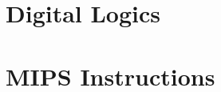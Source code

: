 \documentclass{article}
\begin{document}
\thispagestyle{empty}

\begin{minipage}[t]{0.48\linewidth}
	\section{Digital Logics}
	\begin{multicols}{4}
		
	\end{multicols}
\end{minipage}
\begin{minipage}[t]{0.48\linewidth}
	\section{MIPS Instructions}
	
\end{minipage}
\end{document}
